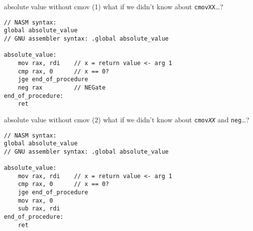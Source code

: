\begin{frame}[fragile,label=absNoCMov1]{absolute value without cmov (1)}
\lstset{
    language=myasm
}
what if we didn't know about \texttt{cmovXX}\ldots?
\begin{lstlisting}
// NASM syntax:
global absolute_value
// GNU assembler syntax: .global absolute_value

absolute_value:
    mov rax, rdi    // x = return value <- arg 1
    cmp rax, 0      // x == 0?
    jge end_of_procedure
    neg rax         // NEGate
end_of_procedure:
    ret
\end{lstlisting}
\end{frame}

\begin{frame}[fragile,label=absNoCMov2]{absolute value without cmov (2)}
\lstset{
    language=myasm,
}
what if we didn't know about \texttt{cmov\textit{XX}} and \texttt{neg}\ldots?
\begin{lstlisting}
// NASM syntax:
global absolute_value
// GNU assembler syntax: .global absolute_value

absolute_value:
    mov rax, rdi    // x = return value <- arg 1
    cmp rax, 0      // x == 0?
    jge end_of_procedure
    mov rax, 0
    sub rax, rdi 
end_of_procedure:
    ret
\end{lstlisting}
\end{frame}
